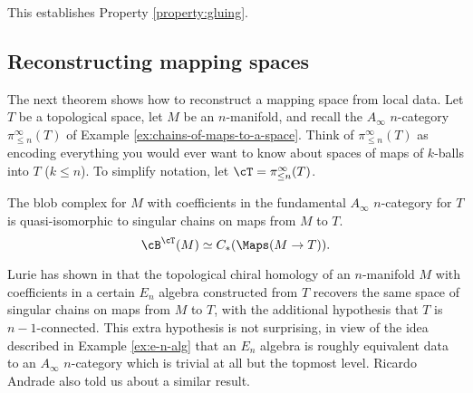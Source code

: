 This establishes Property \ref{property:gluing}.



\medskip

\subsection{Reconstructing mapping spaces}

The next theorem shows how to reconstruct a mapping space from local data.
Let $T$ be a topological space, let $M$ be an $n$-manifold, 
and recall the $A_\infty$ $n$-category $\pi^\infty_{\leq n}(T)$ 
of Example \ref{ex:chains-of-maps-to-a-space}.
Think of $\pi^\infty_{\leq n}(T)$ as encoding everything you would ever
want to know about spaces of maps of $k$-balls into $T$ ($k\le n$).
To simplify notation, let $\cT = \pi^\infty_{\leq n}(T)$.

\begin{thm} \label{thm:map-recon}
The blob complex for $M$ with coefficients in the fundamental $A_\infty$ $n$-category for $T$ 
is quasi-isomorphic to singular chains on maps from $M$ to $T$.
$$\cB^\cT(M) \simeq C_*(\Maps(M\to T)).$$
\end{thm}
\begin{rem}
Lurie has shown in \cite[Theorem 3.8.6]{0911.0018} that the topological chiral homology 
of an $n$-manifold $M$ with coefficients in a certain $E_n$ algebra constructed from $T$ recovers 
the same space of singular chains on maps from $M$ to $T$, with the additional hypothesis that $T$ is $n-1$-connected.
This extra hypothesis is not surprising, in view of the idea described in Example \ref{ex:e-n-alg} 
that an $E_n$ algebra is roughly equivalent data to an $A_\infty$ $n$-category which 
is trivial at all but the topmost level.
Ricardo Andrade also told us about a similar result.
\end{rem}

